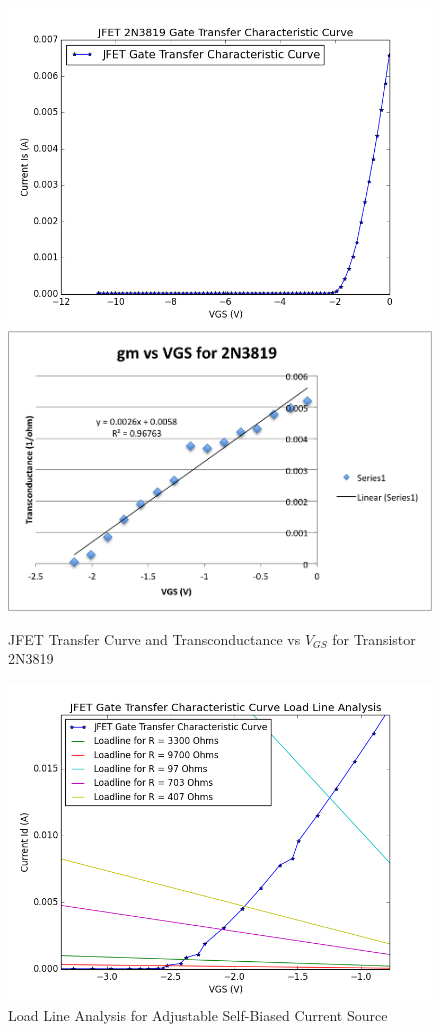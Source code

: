 \documentclass{article}
\begin{document}
    \begin{figure}[H]
        \centering
        \includegraphics[scale = 0.5]{4_6.png}
        \includegraphics[scale = 0.65]{4_6b.png}
        \caption{JFET Transfer Curve and Transconductance vs $V_{GS}$ for Transistor 2N3819}
        \label{fig:my_label}
    \end{figure}
    \begin{figure}[H]
        \centering
        \includegraphics[scale = 0.65]{4_9.png}
        \caption{Load Line Analysis for Adjustable Self-Biased Current Source}
        \label{fig:my_label}
    \end{figure}
\end{document}
